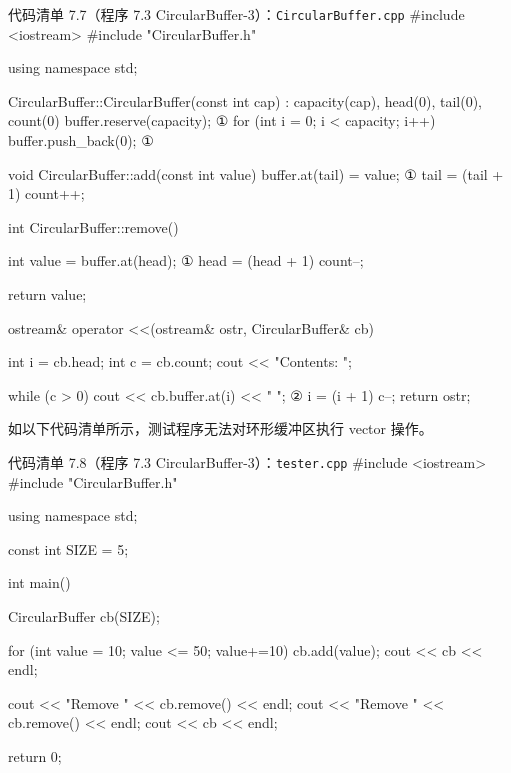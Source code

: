 \begin{codeboxt}{代码清单 7.7（程序 7.3 CircularBuffer-3）：\texttt{Circular\allowbreak{}Buffer.\allowbreak{}cpp}}
#include <iostream>
#include "CircularBuffer.h"

using namespace std;

CircularBuffer::CircularBuffer(const int cap)
    : capacity(cap), head(0), tail(0), count(0)
{
    buffer.reserve(capacity);                               ①
    for (int i = 0; i < capacity; i++) buffer.push_back(0); ①
}

void CircularBuffer::add(const int value)
{
    buffer.at(tail) = value;                                ①
    tail = (tail + 1)%
    count++;
}

int CircularBuffer::remove()
{
    int value = buffer.at(head);                            ①
    head = (head + 1)%
    count--;

    return value;
}

ostream& operator <<(ostream& ostr, CircularBuffer& cb)
{
    int i = cb.head;
    int c = cb.count;
    cout << "Contents: ";

    while (c > 0)
    {
        cout << cb.buffer.at(i) << " ";                     ②
        i = (i + 1)%
        c--;
    }
    return ostr;
}
\end{codeboxt}
\par
{}\par

如以下代码清单所示，测试程序无法对环形缓冲区执行 vector 操作。

\begin{codeboxt}{代码清单 7.8（程序 7.3 CircularBuffer-3）：\texttt{tester.\allowbreak{}cpp}}
#include <iostream>
#include "CircularBuffer.h"

using namespace std;

const int SIZE = 5;

int main()
{
    CircularBuffer cb(SIZE);

    for (int value = 10; value <= 50; value+=10)
    {
        cb.add(value);
    }
    cout << cb << endl;

    cout << "Remove " << cb.remove() << endl;
    cout << "Remove " << cb.remove() << endl;
    cout << cb << endl;

    return 0;
}
\end{codeboxt}

